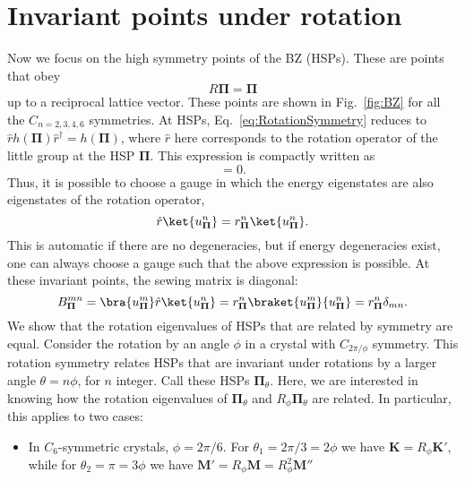 {\section{Invariant points under rotation}
\label{sec:invptswladimir}
Now we focus on the high symmetry points of the BZ (HSPs). These are points that obey
\begin{equation}
R {\mathbf \Pi} = {\mathbf \Pi}
\end{equation}
up to a reciprocal lattice vector. 
These points are shown in Fig.~\ref{fig:BZ} for all the $C_{n=2,3,4,6}$ symmetries. At HSPs, Eq.~\eqref{eq:RotationSymmetry} reduces to $\hat{r} h({\mathbf \Pi}) \hat{r}^\dagger = h({\mathbf \Pi})$, where $\hat{r}$ here corresponds to the rotation operator of the little group at the HSP ${\mathbf \Pi}$. This expression is compactly written as
\begin{equation}
[\hat{r},h({\mathbf \Pi})]=0.
\end{equation}
Thus, it is possible to choose a gauge in which the energy eigenstates are also eigenstates of the rotation operator,
\begin{equation}
\hat{r} \ket{u_{\mathbf \Pi}^n}=r_{\mathbf \Pi}^n \ket{u_{\mathbf \Pi}^n}.
\end{equation}
This is automatic if there are no degeneracies, but if energy degeneracies exist, one can always choose a gauge such that the above expression is possible. At these invariant points, the sewing matrix is diagonal:
\begin{equation}
B_{\mathbf \Pi}^{mn}=\bra{u_{\mathbf \Pi}^m} \hat{r} \ket{u_{\mathbf \Pi}^n}=r^n_{\mathbf \Pi} \braket{u_{\mathbf \Pi}^m}{u_{\mathbf \Pi}^n}=r^n_{\mathbf \Pi} \delta_{mn}.
\end{equation}
We show that the rotation eigenvalues of HSPs that are related by symmetry are equal. Consider the rotation by an angle $\phi$ in a crystal with $C_{2\pi/\phi}$ symmetry. This rotation symmetry relates HSPs that are invariant under rotations by a larger angle $\theta=n \phi$, for $n$ integer. Call these HSPs ${\mathbf \Pi}_{\theta}$. Here, we are interested in knowing how the rotation eigenvalues of ${\mathbf \Pi}_{\theta}$ and $R_\phi {\mathbf \Pi}_{\theta}$ are related. In particular, this applies to two cases:
\begin{itemize}
\item In $C_6$-symmetric crystals, $\phi=2\pi/6$. For ${\theta}_1=2\pi/3=2\phi$ we have $\mathbf{K}=R_\phi \mathbf{K'}$, while for ${\theta}_2=\pi=3\phi$ we have $\mathbf{M'}=R_\phi \mathbf{M}=R_\phi^2 \mathbf{M''}$

\end{itemize}}
